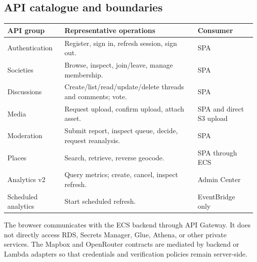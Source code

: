 \documentclass[11pt,a4paper]{article}
\begin{document}
\subsection{API catalogue and boundaries}
\begin{tabularx}{\textwidth}{@{}p{32mm}Yp{30mm}@{}}
\toprule \textbf{API group} & \textbf{Representative operations} & \textbf{Consumer}\\ \midrule
Authentication & Register, sign in, refresh session, sign out. & SPA\\
Societies & Browse, inspect, join/leave, manage membership. & SPA\\
Discussions & Create/list/read/update/delete threads and comments; vote. & SPA\\
Media & Request upload, confirm upload, attach asset. & SPA and direct S3 upload\\
Moderation & Submit report, inspect queue, decide, request reanalysis. & SPA\\
Places & Search, retrieve, reverse geocode. & SPA through ECS\\
Analytics v2 & Query metrics; create, cancel, inspect refresh. & Admin Center\\
Scheduled analytics & Start scheduled refresh. & EventBridge only\\
\bottomrule
\end{tabularx}

The browser communicates with the ECS backend through API Gateway. It does not directly access RDS, Secrets Manager, Glue, Athena, or other private services. The Mapbox and OpenRouter contracts are mediated by backend or Lambda adapters so that credentials and verification policies remain server-side.
\end{document}
